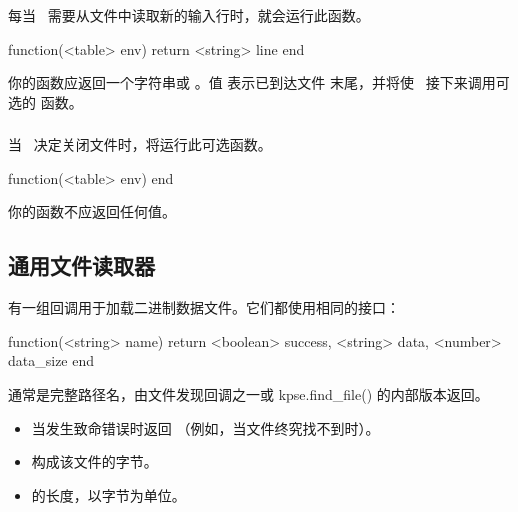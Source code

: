 \subsubsection{}


每当 \LUATEX\ 需要从文件中读取新的输入行时，就会运行此函数。

\begin{typing}
function(<table> env)
    return <string> line
end
\end{typing}

你的函数应返回一个字符串或 。值  表示已到达文件
末尾，并将使 \TEX\ 接下来调用可选的  函数。

\subsubsection{}


当 \LUATEX\ 决定关闭文件时，将运行此可选函数。

\begin{typing}
function(<table> env)
end
\end{typing}

你的函数不应返回任何值。

\subsection{通用文件读取器}


有一组回调用于加载二进制数据文件。它们都使用相同的接口：

\begin{typing}
function(<string> name)
    return <boolean> success, <string> data, <number> data_size
end
\end{typing}

 通常是完整路径名，由文件发现回调之一或 \type
{kpse.find_file()} 的内部版本返回。

\begin{itemize}
\item[\texttt{success}]

当发生致命错误时返回 （例如，当文件终究找不到时）。

\item[\texttt{data}]

构成该文件的字节。

\item[\\texttt{data\_size}]

 的长度，以字节为单位。

\end{itemize}

